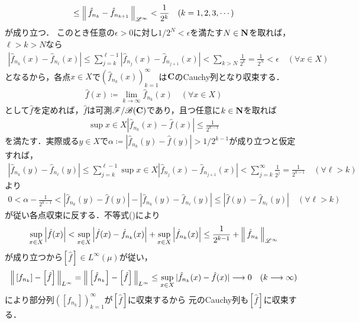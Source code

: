 \begin{prf}
\begin{description}
\begin{align}
				\leq \left\|\, \hat{f}_{n_k} - \hat{f}_{n_{k+1}}\, \right\|_{\mathscr{L}^\infty} < \frac{1}{2^k} \quad (k=1,2,3,\cdots) 
				\label{ineq:Lp_banach_1}
			\end{align}
			が成り立つ．
			このとき任意の$\epsilon > 0$に対し$1/2^N < \epsilon$を満たす$N \in \mathbf{N}$を取れば，$\ell > k > N$なら
			\begin{align}
				\left|\hat{f}_{n_k}(x) - \hat{f}_{n_{\ell}}(x)\right| 
				\leq \sum_{j=k}^{\ell-1}\left|\hat{f}_{n_j}(x) - \hat{f}_{n_{j+1}}(x)\right| 
				< \sum_{k > N} \frac{1}{2^k} = \frac{1}{2^N} < \epsilon
				\quad (\forall x \in X)
			\end{align}
			となるから，各点$x \in X$で$\left( \hat{f}_{n_k}(x) \right)_{k=1}^{\infty}$は$\mathbf{C}$のCauchy列となり収束する．
			\begin{align}
				\hat{f}(x) \coloneqq \lim_{k \to \infty} \hat{f}_{n_k}(x)
				\quad (\forall x \in X)
			\end{align}
			として$\hat{f}$を定めれば，$\hat{f}$は可測$\mathscr{F}/\mathscr{B}(\mathbf{C})$であり，且つ任意に$k \in \mathbf{N}$を取れば
			\begin{align}
				\sup{x \in X}{|\hat{f}_{n_k}(x) - \hat{f}(x)|} \leq \frac{1}{2^{k-1}} \label{ineq:Lp_banach_3}
			\end{align}
			を満たす．実際或る$y \in X$で$\alpha \coloneqq |\hat{f}_{n_k}(y) - \hat{f}(y)| > 1/2^{k-1}$が成り立つと仮定すれば，
			\begin{align}
				\left| \hat{f}_{n_k}(y) - \hat{f}_{n_\ell}(y) \right|
				\leq \sum_{j=k}^{\ell-1} \sup{x \in X}{\left|\hat{f}_{n_j}(x) - \hat{f}_{n_{j+1}}(x)\right|}
				< \sum_{j=k}^{\infty} \frac{1}{2^j}
				= \frac{1}{2^{k-1}}
				\quad (\forall \ell > k)
			\end{align}
			より
			\begin{align}
				0 < \alpha - \frac{1}{2^{k-1}} < \left| \hat{f}_{n_k}(y) - \hat{f}(y) \right| - \left| \hat{f}_{n_k}(y) - \hat{f}_{n_\ell}(y) \right|
				\leq \left| \hat{f}(y) - \hat{f}_{n_\ell}(y) \right|
				\quad (\forall \ell > k)
			\end{align}
			が従い各点収束に反する．不等式()により
			\begin{align}
				\operatorname*{sup}_{x \in X} \left| \hat{f}(x) \right| 
				< \operatorname*{sup}_{x \in X} \left| \hat{f}(x) - \hat{f}_{n_k}(x) \right| + \operatorname*{sup}_{x \in X} \left| \hat{f}_{n_k}(x) \right| 
				\leq \frac{1}{2^{k-1}} + \left\|\, \hat{f}_{n_k}\, \right\|_{\mathscr{L}^\infty}
			\end{align}
			が成り立つから$\left[\hat{f}\right] \in L^\infty(\mu)$が従い，
			\begin{align}
				\left\|\, \left[f_{n_k}\right] - \left[\hat{f}\right]\, \right\|_{L^\infty}
				= \left\|\, \left[\hat{f}_{n_k}\right] - \left[\hat{f}\right]\, \right\|_{L^\infty}
				\leq \operatorname*{sup}_{x \in X} |\hat{f}_{n_k}(x) - \hat{f}(x)|
				\longrightarrow 0 \quad (k \longrightarrow \infty)
			\end{align}
			により部分列$\left( \left[f_{n_k}\right] \right)_{k=1}^{\infty}$が$\left[\hat{f}\right]$に収束するから
			元のCauchy列も$\left[\hat{f}\right]$に収束する．
			

\end{description}
\end{prf}
